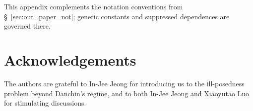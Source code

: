 \documentclass[reqno,11pt]{amsart}
\begin{document}
This appendix complements the notation conventions from \S~\ref{sec:out_paper_not}; generic constants and suppressed dependences are governed there.

\section*{Acknowledgements}
The authors are grateful to In-Jee Jeong for introducing us to the ill-posedness problem beyond Danchin's regime, and to both In-Jee Jeong and Xiaoyutao Luo for stimulating discussions. 





	
 
\end{document}
